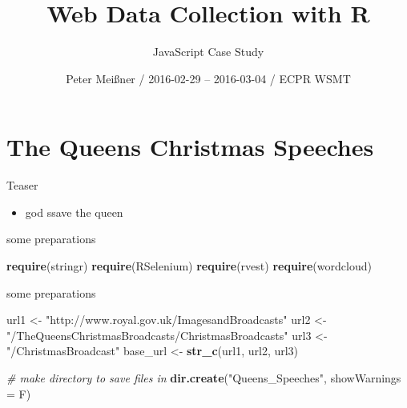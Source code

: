 \documentclass[ignorenonframetext,]{beamer}
\title{Web Data Collection with R}
\subtitle{JavaScript Case Study}
\author{Peter Meißner / 2016-02-29 -- 2016-03-04 / ECPR WSMT}
\date{}
\newenvironment{Shaded}{\begin{snugshade}}{\end{snugshade}}
\newcommand{\KeywordTok}[1]{\textcolor[rgb]{0.13,0.29,0.53}{\textbf{{#1}}}}
\newcommand{\DataTypeTok}[1]{\textcolor[rgb]{0.13,0.29,0.53}{{#1}}}
\newcommand{\StringTok}[1]{\textcolor[rgb]{0.31,0.60,0.02}{{#1}}}
\newcommand{\CommentTok}[1]{\textcolor[rgb]{0.56,0.35,0.01}{\textit{{#1}}}}
\newcommand{\NormalTok}[1]{{#1}}
\providecommand{\tightlist}{%
  \setlength{\itemsep}{0pt}\setlength{\parskip}{0pt}}
\begin{document}
\frame{\titlepage}

\begin{frame}
\tableofcontents[hideallsubsections]
\end{frame}

\section{The Queens Christmas
Speeches}\label{the-queens-christmas-speeches}

\begin{frame}{Teaser}

\begin{itemize}
\tightlist
\item
  god ssave the queen
\end{itemize}

\end{frame}

\begin{frame}[fragile]{some preparations}

\begin{Shaded}
\begin{Highlighting}[]
\KeywordTok{require}\NormalTok{(stringr)}
\KeywordTok{require}\NormalTok{(RSelenium)}
\KeywordTok{require}\NormalTok{(rvest)}
\KeywordTok{require}\NormalTok{(wordcloud)}
\end{Highlighting}
\end{Shaded}

\end{frame}

\begin{frame}[fragile]{some preparations}

\begin{Shaded}
\begin{Highlighting}[]
\NormalTok{url1 <-}\StringTok{ "http://www.royal.gov.uk/ImagesandBroadcasts"}
\NormalTok{url2 <-}\StringTok{ "/TheQueensChristmasBroadcasts/ChristmasBroadcasts"}
\NormalTok{url3 <-}\StringTok{ "/ChristmasBroadcast"}
\NormalTok{base_url <-}\StringTok{ }\KeywordTok{str_c}\NormalTok{(url1, url2, url3)}

\CommentTok{# make directory to save files in }
\KeywordTok{dir.create}\NormalTok{(}\StringTok{"Queens_Speeches"}\NormalTok{, }\DataTypeTok{showWarnings =} \NormalTok{F)}
\end{Highlighting}
\end{Shaded}

\end{frame}
\end{document}
